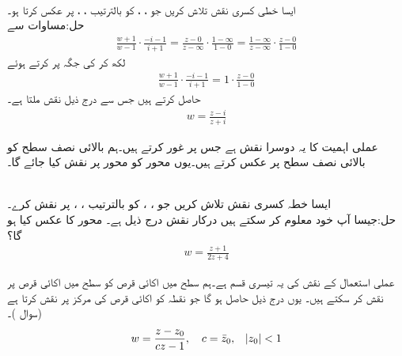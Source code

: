 \quad {}\\
ایسا خطی کسری نقش تلاش کریں جو ، ،  کو بالترتیب ، ،  پر عکس کرتا ہو۔\\
حل:\quad مساوات  سے 
\begin{align*}
\frac{w+1}{w-1}\cdot \frac{-i-1}{i+1}=\frac{z-0}{z-\infty}\cdot \frac{1-\infty}{1-0}=\frac{1-\infty}{z-\infty}\cdot \frac{z-0}{1-0}
\end{align*}
لکھ کر  کی جگہ  پر کرتے  ہوئے 
\begin{align*}
\frac{w+1}{w-1}\cdot \frac{-i-1}{i+1}=1\cdot \frac{z-0}{1-0}
\end{align*}
حاصل کرتے ہیں جس سے درج ذیل نقش ملتا ہے۔
\begin{align}\label{مساوات_نقش_مثال_ب}
w=\frac{z-i}{z+i}
\end{align}

 عملی اہمیت کا یہ دوسرا نقش ہے جس پر غور کرتے ہیں۔ہم بالائی نصف سطح  کو بالائی نصف سطح  پر عکس کرتے ہیں۔یوں  محور کو  محور پر نقش کیا جائے گا۔

\quad {}\\
ایسا خطہ کسری نقش تلاش کریں جو ، ،  کو بالترتیب ، ،  پر نقش کرے۔\\
حل:\quad جیسا آپ خود معلوم کر سکتے ہیں درکار نقش درج ذیل ہے۔ محور کا عکس کیا ہو گا؟
\begin{align}
w=\frac{z+1}{2z+4}
\end{align}

 عملی استعمال کے نقش کی یہ تیسری قسم ہے۔ہم  سطح میں اکائی قرص کو  سطح میں اکائی قرص پر نقش کر سکتے ہیں۔ یوں درج ذیل حاصل ہو گا جو نقطہ  کو اکائی قرص کی مرکز  پر نقش کرتا ہے (سوال )۔
\begin{align}\label{مساوات_نقش_قرص_کا_نقش_قرص}
w=\frac{z-z_0}{cz-1},\quad c=\bar{z}_0,\quad \abs{z_0}<1
\end{align}

